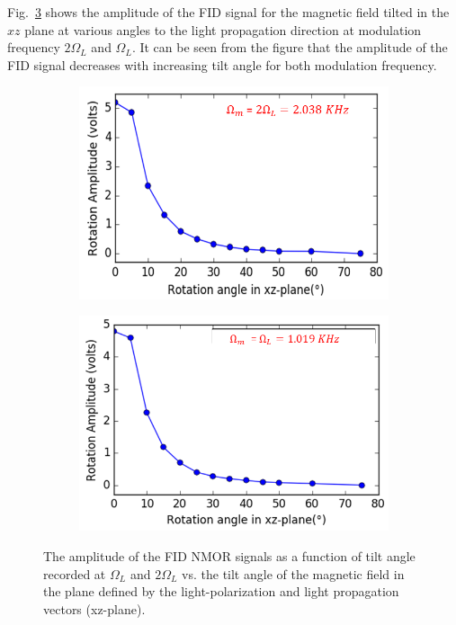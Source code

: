 Fig.~\ref{fig:tilted-wrong} shows the amplitude of the FID signal for the magnetic field tilted in the $xz$ plane at various angles to the light propagation direction at modulation frequency $2\Omega_L$ and $\Omega_L$. It can be seen from the figure that the amplitude of the FID signal decreases with increasing tilt angle for both modulation frequency. 

\begin{figure}
    \centering
   \begin{subfigure}[b]{0.45\textwidth}
        \centering
        \includegraphics[width=\textwidth]{figures/tilt_x_larmor.png}
        \caption{}
        \label{fig:y equals x}
    \end{subfigure}
    \hfill
     \begin{subfigure}[b]{0.45\textwidth}
        \centering
        \includegraphics[width=\textwidth]{figures/tilt_x_2larmor.png}
        \caption{}
        \label{fig:three sin x}
    \end{subfigure}
    \caption{ The amplitude of the FID NMOR signals as a function
      of tilt angle recorded at $\Omega_L$ and $2\Omega_L$ vs. the
      tilt angle of the magnetic field in the plane defined by the
      light-polarization and light propagation vectors (xz-plane). \label{fig:tilted-wrong}}
\end{figure}

